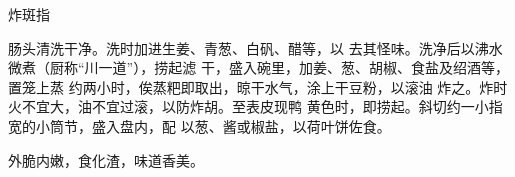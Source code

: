 \begin{recipe}{炸斑指}

\ingredients


\cooking

肠头清洗干净。洗时加进生姜、青葱、白矾、醋等，以 去其怪味。洗净后以沸水微煮（厨称“川一道”），捞起滤 干，盛入碗里，加姜、葱、胡椒、食盐及绍酒等，置笼上蒸 约两小时，俟蒸粑即取出，晾干水气，涂上干豆粉，以滚油 炸之。炸时火不宜大，油不宜过滚，以防炸胡。至表皮现鸭 黄色时，即捞起。斜切约一小指宽的小筒节，盛入盘内，配 以葱、酱或椒盐，以荷叶饼佐食。

\notes

外脆内嫩，食化渣，味道香美。

\end{recipe}

